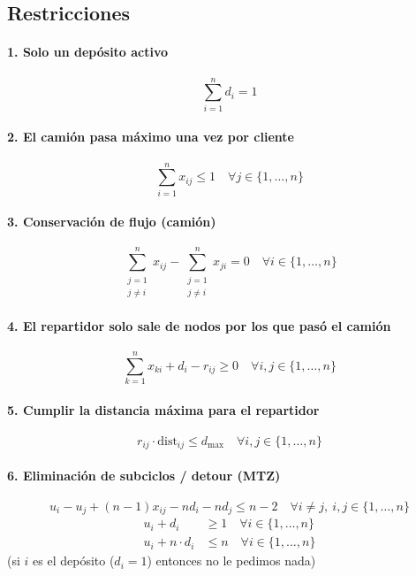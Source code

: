 \documentclass{article}
\begin{document}
\subsection*{Restricciones}

\paragraph{1. Solo un depósito activo}
\[
\sum_{i=1}^{n} d_i = 1
\]

\paragraph{2. El camión pasa máximo una vez por cliente}
\[
\sum_{i=1}^{n} x_{ij} \leq 1 \quad \forall j \in \{1, \dots, n\}
\]

\paragraph{3. Conservación de flujo (camión)}
\[
\sum_{\substack{j=1 \\ j \ne i}}^{n} x_{ij} - \sum_{\substack{j=1 \\ j \ne i}}^{n} x_{ji} = 0 \quad \forall i \in \{1, \dots, n\}
\]

\paragraph{4. El repartidor solo sale de nodos por los que pasó el camión}
\[
\sum_{k=1}^{n} x_{ki} + d_i - r_{ij} \geq 0 \quad \forall i,j \in \{1, \dots, n\}
\]

\paragraph{5. Cumplir la distancia máxima para el repartidor}
\[
r_{ij} \cdot \text{dist}_{ij} \leq d_{\text{max}} \quad \forall i,j \in \{1, \dots, n\}
\]

\paragraph{6. Eliminación de subciclos / detour (MTZ)} 
\[
u_i - u_j + (n - 1) x_{ij} - n d_i - n d_j \leq n - 2 \quad \forall i \ne j,\ i,j \in \{1, \dots, n\}
\]
\begin{align*}
u_i + d_i &\geq 1 \quad \forall i \in \{1, \dots, n\} \\
u_i + n \cdot d_i &\leq n \quad \forall i \in \{1, \dots, n\}
\end{align*}
(si $i$ es el depósito ($d_i=1$) entonces no le pedimos nada)
\end{document}
